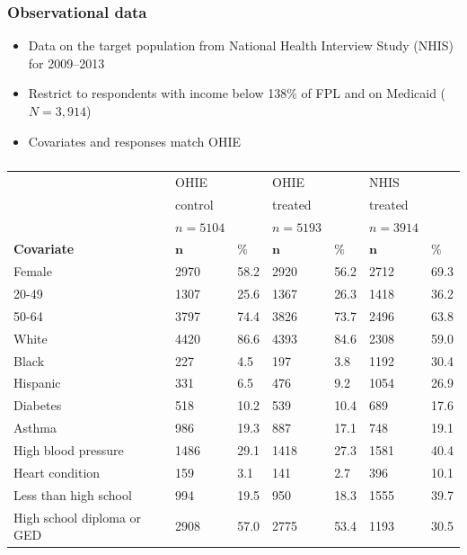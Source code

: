 \documentclass{beamer}
\begin{document}
\begin{frame}
\frametitle{Observational data}
\begin{itemize}
\item Data on the target population from National Health Interview Study (NHIS) \cite{NHIS} for 2009--2013
\item Restrict to respondents with income below 138\% of FPL and on Medicaid ($N=3,914$)
\item Covariates and responses match OHIE
\end{itemize}
\end{frame}

\begin{frame}
\frametitle{}
{\scriptsize
\begin{longtable}{lllllll}
  & OHIE &  & OHIE &  & NHIS &  \\ 
    & control &  & treated &  &treated &   \\ 
  & $n=5104$ &  & $n=5193$ &  & $n=3914$ &  \\  
  \hline   
    \hline   
 \textbf{Covariate} &  $\mathbf{n}$ & $\mathbf{\%}$ & $\mathbf{n}$ & $\mathbf{\%}$ & $\mathbf{n}$ & $\mathbf{\%}$ \\ 
\hline
Female & 2970 & 58.2 & 2920 & 56.2 & 2712 & 69.3  \\ 
   \hline
20-49 & 1307 & 25.6 & 1367 & 26.3 & 1418 & 36.2  \\ 
   \hline
50-64 & 3797 & 74.4 & 3826 & 73.7 & 2496 & 63.8 \\ 
   \hline
White & 4420 & 86.6 & 4393 & 84.6 & 2308 & 59.0  \\ 
   \hline
Black & 227 & 4.5 & 197 & 3.8 & 1192 & 30.4  \\ 
   \hline
Hispanic & 331 & 6.5 & 476 & 9.2 & 1054 & 26.9  \\ 
   \hline
Diabetes & 518 & 10.2 & 539 & 10.4 & 689 & 17.6 \\ 
   \hline
Asthma & 986 & 19.3 & 887 & 17.1 & 748 & 19.1  \\ 
   \hline
High blood pressure & 1486 & 29.1 & 1418 & 27.3 & 1581 & 40.4  \\ 
   \hline
Heart condition & 159 & 3.1 & 141 & 2.7 & 396 & 10.1 \\ 
   \hline
Less than high school  & 994 & 19.5 & 950 & 18.3 & 1555 & 39.7  \\ 
   \hline
High school diploma or GED & 2908 & 57.0 & 2775 & 53.4 & 1193 & 30.5 \\ 

\end{longtable}}
\end{frame}
\end{document}
